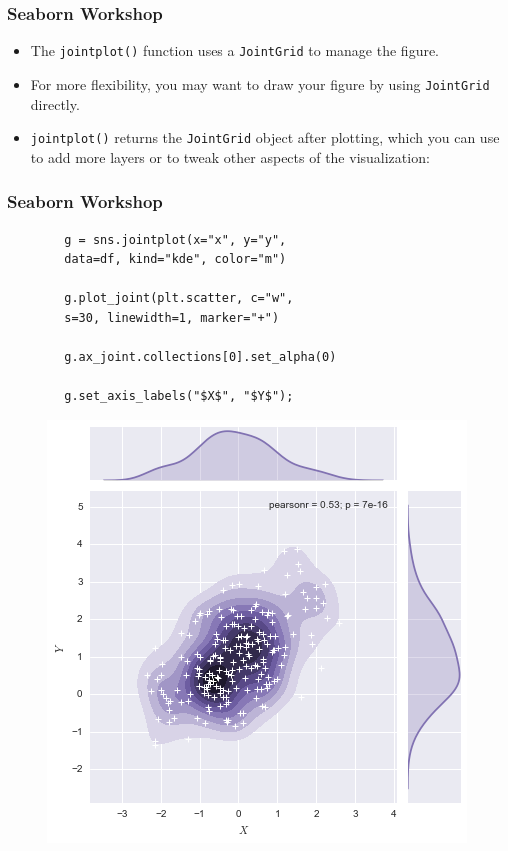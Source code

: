\documentclass{beamer}
\begin{document}
\begin{frame}[fragile]
	\frametitle{Seaborn Workshop}
	\large
	\begin{itemize}
		\item The \texttt{jointplot()} function uses a \texttt{JointGrid} to manage the figure. \bigskip
		\item For more flexibility, you may want to draw your figure by using \texttt{JointGrid} directly. \bigskip
		\item  \texttt{jointplot()} returns the \texttt{JointGrid} object after plotting, which you can use to add more layers or to tweak other aspects of the visualization:
	\end{itemize}
	
	
	
	
\end{frame}
\begin{frame}[fragile]
	\frametitle{Seaborn Workshop}	\large
	
	\begin{framed}
		\begin{verbatim}
		g = sns.jointplot(x="x", y="y", 
		data=df, kind="kde", color="m")
		
		g.plot_joint(plt.scatter, c="w", 
		s=30, linewidth=1, marker="+")
		
		g.ax_joint.collections[0].set_alpha(0)
		
		g.set_axis_labels("$X$", "$Y$");
		\end{verbatim}
	\end{framed}
\end{frame}
\begin{frame}[fragile]
	\large
	\begin{figure}
		\centering
		\includegraphics[width=0.75\linewidth]{images/distributions_40_0}
	\end{figure}
	
	
\end{frame}
\end{document}
